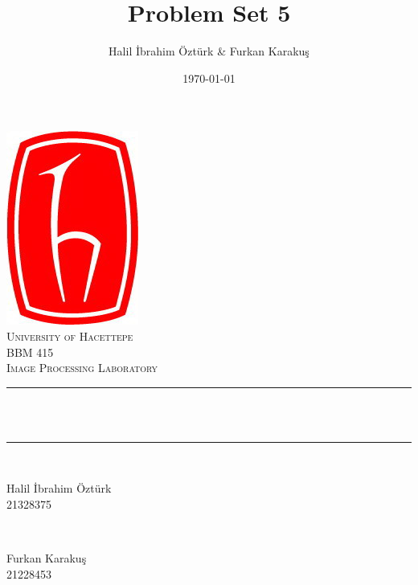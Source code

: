 \documentclass[12pt]{article}
\title{Problem Set 5}                             %
\author{Halil \.{I}brahim \"{O}zt\"{u}rk \& Furkan Karakuş}               %
\date{\today}                                           %
\makeatletter
\let\thetitle\@title
\let\thedate\@date
\makeatother
\begin{document}

\begin{titlepage}
    \centering
    \vspace*{0.5 cm}
    \includegraphics[scale = 0.5]{hacettepe.jpg}\\[1.0 cm]   %
    \textsc{\LARGE University of Hacettepe}\\[2.0 cm]   %
    \textsc{\Large BBM 415}\\[0.5 cm]               %
    \textsc{\large Image Processing Laboratory}\\[0.5 cm]               %
    \rule{\linewidth}{0.2 mm} \\[0.4 cm]
    { \huge \bfseries \thetitle}\\
    \rule{\linewidth}{0.2 mm} \\[1.5 cm]
    
    \begin{minipage}{0.4\textwidth}
        \begin{flushleft} \large
	   Halil \.{I}brahim \"{O}zt\"{u}rk \\
            21328375                                   %

         \end{flushleft}
            \end{minipage}~
            \begin{minipage}{0.4\textwidth}
         \begin{flushright} \large
            Furkan Karakuş \\
            21228453                                   %

        \end{flushright}
    \end{minipage}\\[2 cm]
    
    {\large \thedate}\\[2 cm]
 
    \vfill
    
\end{titlepage}
\end{document}
